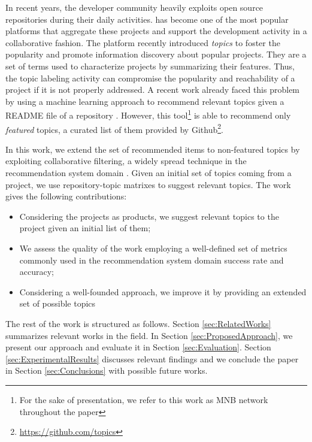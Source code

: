 In recent years, the developer community heavily exploits open source repositories during their daily activities. \GH has become one of the most
popular platforms that aggregate these projects and
support the development activity in a collaborative fashion.
%
The platform recently introduced \emph{topics} to foster the popularity and promote information discovery about popular projects. They are a set of terms used to characterize projects by summarizing their features.  
Thus, the topic labeling activity can compromise the popularity and reachability of a project if it is not properly addressed. A recent work already faced this problem by using a machine learning approach to recommend relevant topics given a README file of a repository  \cite{MNB}. However, this tool\footnote{For the sake of presentation, we refer to this work as MNB network throughout the paper} is able to recommend only \emph{featured} topics, a curated list of them provided by Github\footnote{\url{https://github.com/topics}}.

In this work, we extend the set of recommended items to non-featured topics by exploiting collaborative filtering, a widely spread technique in the recommendation system domain \cite{Schafer:2007:CFR:1768197.1768208}. Given an initial set of topics coming from a \GH project, we use repository-topic matrixes to suggest relevant topics.
The work gives the following contributions:
\begin{itemize}
\item Considering the \GH projects as products, we suggest relevant topics to the project given an initial list of them;
\item We assess the quality of the work employing a well-defined set of metrics commonly used in the recommendation system domain \ie success rate and accuracy;
\item Considering a well-founded approach, we improve it by providing an extended set of possible topics  
\end{itemize}

The rest of the work is structured as follows. Section \ref{sec:RelatedWorks} summarizes relevant works in the field. In Section \ref{sec:ProposedApproach}, we present our approach and evaluate it in Section \ref{sec:Evaluation}. Section \ref{sec:ExperimentalResults} discusses relevant findings and we conclude the paper in Section \ref{sec:Conclusions} with possible future works.
